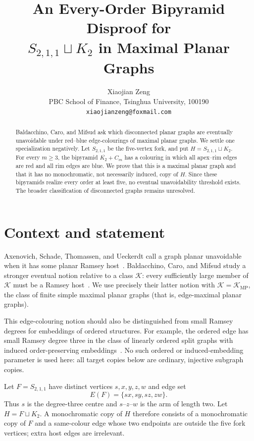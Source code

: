 \documentclass[10pt]{article}
\title{An Every-Order Bipyramid Disproof for\\
$S_{2,1,1}\sqcup K_2$ in Maximal Planar Graphs}
\author{Xiaojian Zeng\\
PBC School of Finance, Tsinghua University, 100190\\
\texttt{xiaojianzeng@foxmail.com}}
\date{}
\begin{document}
\maketitle

\begin{abstract}
Baldacchino, Caro, and Mifsud ask which disconnected planar graphs are
eventually unavoidable under red--blue edge-colourings of maximal planar
graphs.  We settle one specialization negatively.  Let $S_{2,1,1}$ be the
five-vertex fork, and put $H=S_{2,1,1}\sqcup K_2$.  For every $m\geq 3$, the
bipyramid $\overline{K_2}+C_m$ has a colouring in which all apex--rim edges
are red and all rim edges are blue.  We prove that this is a maximal planar
graph and that it has no monochromatic, not necessarily induced, copy of
$H$.  Since these bipyramids realize every order at least five, no eventual
unavoidability threshold exists.  The broader classification of disconnected
graphs remains unresolved.
\end{abstract}

\section{Context and statement}

Axenovich, Schade, Thomassen, and Ueckerdt call a graph planar unavoidable
when it has some planar Ramsey host~\cite{AxenovichEtAl2019}.  Baldacchino,
Caro, and Mifsud study a stronger eventual notion relative to a class
$\mathcal K$: every sufficiently large member of $\mathcal K$ must be a
Ramsey host~\cite{BaldacchinoCaroMifsud2026}.  We use precisely their latter
notion with $\mathcal K=\mathcal K_{\mathrm{MP}}$, the class of finite simple
maximal planar graphs (that is, edge-maximal planar graphs).

This edge-colouring notion should also be distinguished from small Ramsey
degrees for embeddings of ordered structures.  For example, the ordered edge
has small Ramsey degree three in the class of linearly ordered split graphs
with induced order-preserving embeddings~\cite{Zeng2026SmallRamsey}.  No such
ordered or induced-embedding parameter is used here: all target copies below
are ordinary, injective subgraph copies.

Let $F=S_{2,1,1}$ have distinct vertices $s,x,y,z,w$ and edge set
\[
 E(F)=\{sx,sy,sz,zw\}.
\]
Thus $s$ is the degree-three centre and $s$--$z$--$w$ is the arm of length
two.  Let $H=F\sqcup K_2$.  A monochromatic copy of $H$ therefore consists of
a monochromatic copy of $F$ and a same-colour edge whose two endpoints are
outside the five fork vertices; extra host edges are irrelevant.
\end{document}
